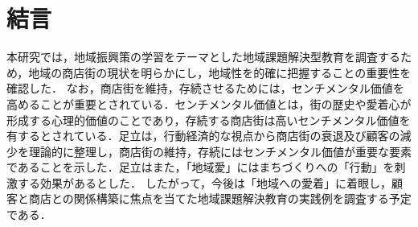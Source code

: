 \section{結言}

本研究では，地域振興策の学習をテーマとした地域課題解決型教育を調査するため，地域の商店街の現状を明らかにし，地域性を的確に把握することの重要性を確認した．%
なお，商店街を維持，存続させるためには，センチメンタル価値を高めることが重要とされている．センチメンタル価値とは，街の歴史や愛着心が形成する心理的価値のことであり，存続する商店街は高いセンチメンタル価値を有するとされている\cite{足立基浩2015}．足立は，行動経済的な視点から商店街の衰退及び顧客の減少を理論的に整理し，商店街の維持，存続にはセンチメンタル価値が重要な要素であることを示した．足立はまた，「地域愛」にはまちづくりへの「行動」を刺激する効果があるとした．%
したがって，今後は「地域への愛着」に着眼し，顧客と商店との関係構築に焦点を当てた地域課題解決教育の実践例を調査する予定である．
